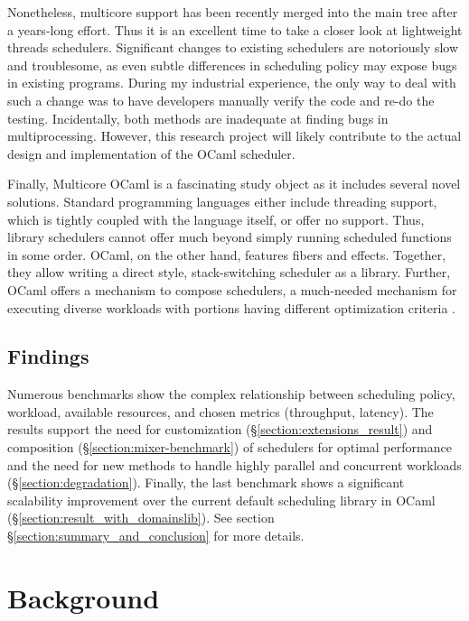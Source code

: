 \documentclass[12pt,a4paper,twoside]{report}
\begin{document}
Nonetheless, multicore support has been recently merged into the main tree after a years-long effort. Thus it is an excellent time to take a closer look at lightweight threads schedulers. Significant changes to existing schedulers are notoriously slow and troublesome, as even subtle differences in scheduling policy may expose bugs in existing programs. During my industrial experience, the only way to deal with such a change was to have developers manually verify the code and re-do the testing. Incidentally, both methods are inadequate at finding bugs in multiprocessing. However, this research project will likely contribute to the actual design and implementation of the OCaml scheduler. 

Finally, Multicore OCaml is a fascinating study object as it includes several novel solutions. Standard programming languages either include threading support, which is tightly coupled with the language itself, or offer no support. Thus, library schedulers cannot offer much beyond simply running scheduled functions in some order. OCaml, on the other hand, features fibers and effects. Together, they allow writing a direct style, stack-switching scheduler as a library. Further, OCaml offers a mechanism to compose schedulers, a much-needed mechanism for executing diverse workloads with portions having different optimization criteria \cite{Tennenhouse89layeredmultiplexing}.

\section{Findings}
\label{section:findings}

Numerous benchmarks show the complex relationship between scheduling policy, workload, available resources, and chosen metrics (throughput, latency). The results support the need for customization (\S\ref{section:extensions_result}) and composition (\S\ref{section:mixer-benchmark}) of schedulers for optimal performance and the need for new methods to handle highly parallel and concurrent workloads (\S\ref{section:degradation}). Finally, the last benchmark shows a significant scalability improvement over the current default scheduling library in OCaml (\S\ref{section:result_with_domainslib}). See section \S\ref{section:summary_and_conclusion} for more details.


\chapter{Background}
\end{document}
